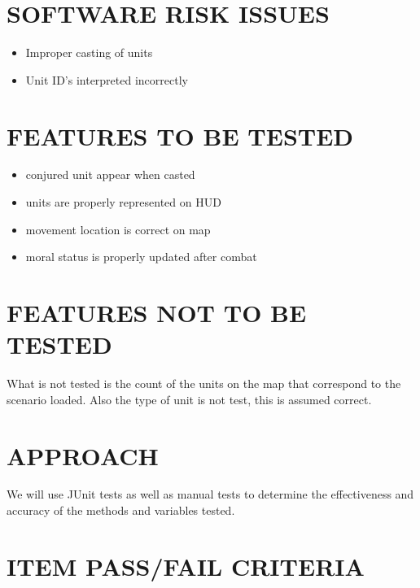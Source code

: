 \section[SOFTWARE RISK ISSUES]{\bfseries\color{black} SOFTWARE RISK ISSUES}
{\itshape\color{black}

{\color{black}
\begin{itemize}
\item Improper casting of units
\item Unit ID's interpreted incorrectly
\end{itemize}
}

\section[FEATURES TO BE TESTED]{\bfseries\color{black} FEATURES TO BE TESTED}

{\color{black}
\begin{itemize}
\item conjured unit appear when casted
\item units are properly represented on HUD
\item movement location is correct on map
\item moral status is properly updated after combat
\end{itemize}
}

\section[FEATURES NOT TO BE TESTED]{\bfseries\color{black} FEATURES NOT TO BE TESTED}

{\color{black}
What is not tested is the count of the units on the map that correspond to the scenario loaded. Also the type of unit is not test, this is assumed correct. 
}

\section[APPROACH]{\bfseries\color{black} APPROACH}
{\itshape\color{black}

{\color{black}
We will use JUnit tests as well as manual tests to determine the effectiveness and accuracy of the methods and variables tested. 
}

\section[ITEM PASS/FAIL CRITERIA]{\bfseries\color{black}
	 ITEM PASS/FAIL CRITERIA}

}}
